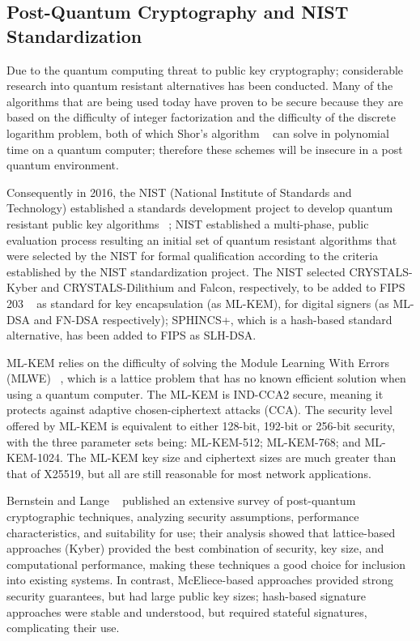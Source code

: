\documentclass{ieeeaccess}
\begin{document}
\subsection{Post-Quantum Cryptography and NIST Standardization}

Due to the quantum computing threat to public key cryptography; considerable research into quantum resistant alternatives has been conducted. Many of the algorithms that are being used today have proven to be secure because they are based on the difficulty of integer factorization and the difficulty of the discrete logarithm problem, both of which Shor's algorithm ~\cite{shor1994} can solve in polynomial time on a quantum computer; therefore these schemes will be insecure in a post quantum environment.

Consequently in 2016, the NIST (National Institute of Standards and Technology) established a standards development project to develop quantum resistant public key algorithms ~\cite{b2}; NIST established a multi-phase, public evaluation process resulting an initial set of quantum resistant algorithms that were selected by the NIST for formal qualification according to the criteria established by the NIST standardization project. The NIST selected CRYSTALS-Kyber and CRYSTALS-Dilithium and Falcon, respectively, to be added to FIPS 203 ~\cite{fips203} as standard for key encapsulation (as ML-KEM), for digital signers (as ML-DSA and FN-DSA respectively); SPHINCS+, which is a hash-based standard alternative, has been added to FIPS as SLH-DSA.


ML-KEM relies on the difficulty of solving the Module Learning With Errors (MLWE) ~\cite{regev2005}, which is a lattice problem that has no known efficient solution when using a quantum computer. The ML-KEM is IND-CCA2 secure, meaning it protects against adaptive chosen-ciphertext attacks (CCA). The security level offered by ML-KEM is equivalent to either 128-bit, 192-bit or 256-bit security, with the three parameter sets being: ML-KEM-512; ML-KEM-768; and ML-KEM-1024. The ML-KEM key size and ciphertext sizes are much greater than that of X25519, but all are still reasonable for most network applications.

Bernstein and Lange ~\cite{bernstein2017} published an extensive survey of post-quantum cryptographic techniques, analyzing security assumptions, performance characteristics, and suitability for use; their analysis showed that lattice-based approaches (Kyber) provided the best combination of security, key size, and computational performance, making these techniques a good choice for inclusion into existing systems. In contrast, McEliece-based approaches provided strong security guarantees, but had large public key sizes; hash-based signature approaches were stable and understood, but required stateful signatures, complicating their use.
\end{document}
